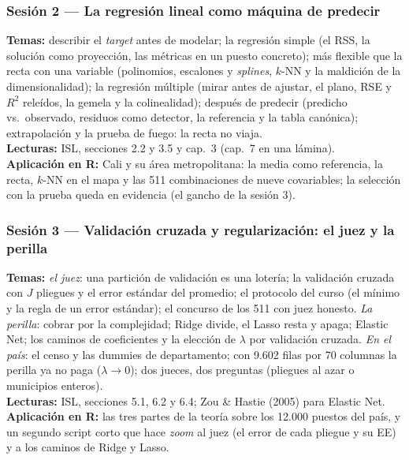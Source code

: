 \documentclass[12pt,a4paper]{article}
\begin{document}
\subsubsection{Sesión 2 --- La regresión lineal como máquina de predecir}
\textbf{Temas:} describir el \emph{target} antes de modelar; la regresión simple (el RSS, la solución como proyección, las métricas en un puesto concreto); más flexible que la recta con una variable (polinomios, escalones y \emph{splines}, $k$-NN y la maldición de la dimensionalidad); la regresión múltiple (mirar antes de ajustar, el plano, RSE y $R^2$ releídos, la gemela y la colinealidad); después de predecir (predicho vs.\ observado, residuos como detector, la referencia y la tabla canónica); extrapolación y la prueba de fuego: la recta no viaja. \\
\textbf{Lecturas:} ISL, secciones 2.2 y 3.5 y cap.\ 3 (cap.\ 7 en una lámina). \\
\textbf{Aplicación en R:} Cali y su área metropolitana: la media como referencia, la recta, $k$-NN en el mapa y las 511 combinaciones de nueve covariables; la selección con la prueba queda en evidencia (el gancho de la sesión 3).

\subsubsection{Sesión 3 --- Validación cruzada y regularización: el juez y la perilla}
\textbf{Temas:} \emph{el juez}: una partición de validación es una lotería; la validación cruzada con $J$ pliegues y el error estándar del promedio; el protocolo del curso (el mínimo y la regla de un error estándar); el concurso de los 511 con juez honesto. \emph{La perilla}: cobrar por la complejidad; Ridge divide, el Lasso resta y apaga; Elastic Net; los caminos de coeficientes y la elección de $\lambda$ por validación cruzada. \emph{En el país}: el censo y las dummies de departamento; con 9.602 filas por 70 columnas la perilla ya no paga ($\lambda \to 0$); dos jueces, dos preguntas (pliegues al azar o municipios enteros). \\
\textbf{Lecturas:} ISL, secciones 5.1, 6.2 y 6.4; Zou \& Hastie (2005) para Elastic Net. \\
\textbf{Aplicación en R:} las tres partes de la teoría sobre los 12.000 puestos del país, y un segundo script corto que hace \emph{zoom} al juez (el error de cada pliegue y su EE) y a los caminos de Ridge y Lasso.
\end{document}
